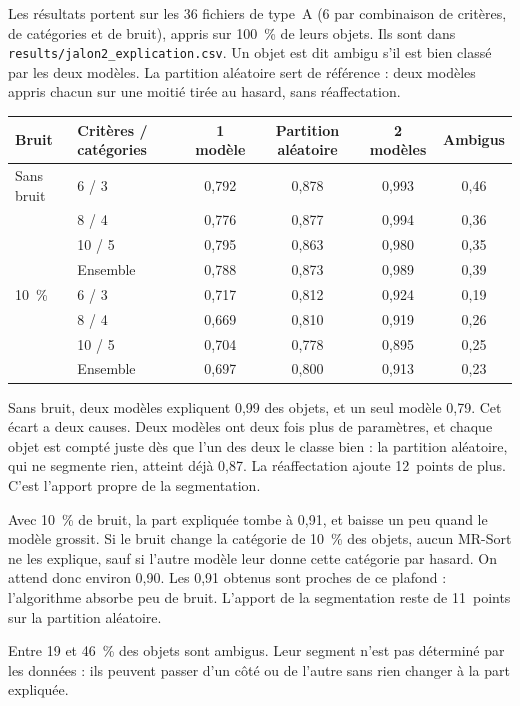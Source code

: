 \documentclass[11pt,a4paper]{article}
\begin{document}
Les résultats portent sur les 36 fichiers de type~A (6 par combinaison de critères, de catégories et de bruit), appris sur 100~\% de leurs objets. Ils sont dans \texttt{results/jalon2\_explication.csv}. Un objet est dit ambigu s'il est bien classé par les deux modèles. La partition aléatoire sert de référence : deux modèles appris chacun sur une moitié tirée au hasard, sans réaffectation.

\begin{center}
\begin{tabular}{llcccc}
\toprule
Bruit & Critères / catégories & 1 modèle & Partition aléatoire & 2 modèles & Ambigus \\
\midrule
Sans bruit & 6 / 3 & 0,792 & 0,878 & 0,993 & 0,46 \\
 & 8 / 4 & 0,776 & 0,877 & 0,994 & 0,36 \\
 & 10 / 5 & 0,795 & 0,863 & 0,980 & 0,35 \\
 & Ensemble & 0,788 & 0,873 & 0,989 & 0,39 \\
\midrule
10~\% & 6 / 3 & 0,717 & 0,812 & 0,924 & 0,19 \\
 & 8 / 4 & 0,669 & 0,810 & 0,919 & 0,26 \\
 & 10 / 5 & 0,704 & 0,778 & 0,895 & 0,25 \\
 & Ensemble & 0,697 & 0,800 & 0,913 & 0,23 \\
\bottomrule
\end{tabular}
\end{center}

Sans bruit, deux modèles expliquent 0,99 des objets, et un seul modèle 0,79. Cet écart a deux causes. Deux modèles ont deux fois plus de paramètres, et chaque objet est compté juste dès que l'un des deux le classe bien : la partition aléatoire, qui ne segmente rien, atteint déjà 0,87. La réaffectation ajoute 12~points de plus. C'est l'apport propre de la segmentation.

Avec 10~\% de bruit, la part expliquée tombe à 0,91, et baisse un peu quand le modèle grossit. Si le bruit change la catégorie de 10~\% des objets, aucun MR-Sort ne les explique, sauf si l'autre modèle leur donne cette catégorie par hasard. On attend donc environ 0,90. Les 0,91 obtenus sont proches de ce plafond : l'algorithme absorbe peu de bruit. L'apport de la segmentation reste de 11~points sur la partition aléatoire.

Entre 19 et 46~\% des objets sont ambigus. Leur segment n'est pas déterminé par les données : ils peuvent passer d'un côté ou de l'autre sans rien changer à la part expliquée.
\end{document}

